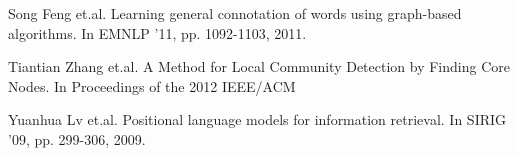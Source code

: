 \documentclass[runningheads]{llncs}
\begin{document}
\begin{thebibliography}{8}
Song Feng et.al.
\newblock Learning general connotation of words using graph-based algorithms.
\newblock In EMNLP ’11, pp. 1092-1103, 2011.

Tiantian Zhang et.al.
\newblock A Method for Local Community Detection by Finding Core Nodes. 
\newblock In Proceedings of the 2012 IEEE/ACM 

Yuanhua Lv et.al.
\newblock Positional language models for information retrieval.
\newblock In SIRIG ’09, pp. 299-306, 2009.


\end{thebibliography}
\end{document}
